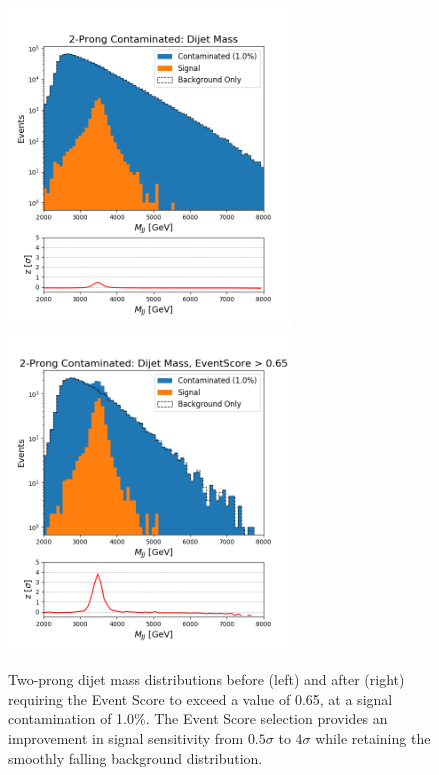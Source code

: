 \documentclass[11pt, a4paper]{article}
\begin{document}
\begin{figure}[H]
	\begin{center}
		\includegraphics[width=213pt]{imgs/2Prong_Contaminated_1p0_JJ_Mass_Multi_SaveForPaper_Lead.png}
		\includegraphics[width=213pt]{imgs/2Prong_Contaminated_1p0_JJ_Mass_EventScore0p65_Multi_SaveForPaper_Lead.png}
	\end{center}
	\caption{Two-prong dijet mass distributions before (left) and after (right) requiring the Event Score to exceed a value of 0.65, at a signal contamination of 1.0\%. The Event Score selection provides an improvement in signal sensitivity from $0.5\sigma$ to $4\sigma$ while retaining the smoothly falling background distribution.}
	\label{fig:2p_dijet}
\end{figure}
\end{document}
